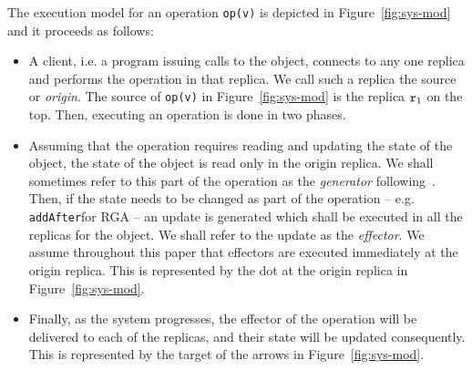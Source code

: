 The execution model for an operation \lstinline|op(v)| is depicted in Figure~\ref{fig:sys-mod} and it proceeds as follows:
\begin{itemize}
\item A client, i.e. a program issuing calls to the object, connects
  to any one replica %
  and performs the operation in that replica. We call such a
  replica the source or \emph{origin}. The source of \lstinline|op(v)|
  in Figure~\ref{fig:sys-mod} is the replica $\mathtt{r}_1$ on the top.
  Then, executing an operation is done in two phases.
\item Assuming that the operation requires reading and updating the
  state of the object, the state of the object is read only in the origin replica.
  We shall sometimes refer to this part of the operation as the
  \emph{generator} following~\cite{ShapiroPBZ11}.
  Then, if the state needs to be changed as part of the operation --
  e.g. \lstinline|addAfter|for RGA -- an update is
  generated which shall be executed in all the replicas for the
  object.
  We shall refer to the update as the \emph{effector}.
  We assume throughout this paper that effectors are executed
  immediately at the origin replica.
  This is represented by the dot at the origin replica
  in Figure~\ref{fig:sys-mod}.
\item Finally, as the system progresses, the effector of the operation
  will be delivered to each of the replicas, and their state will be
  updated consequently.
  This is represented by the target of the arrows
  in Figure~\ref{fig:sys-mod}.
\end{itemize}

